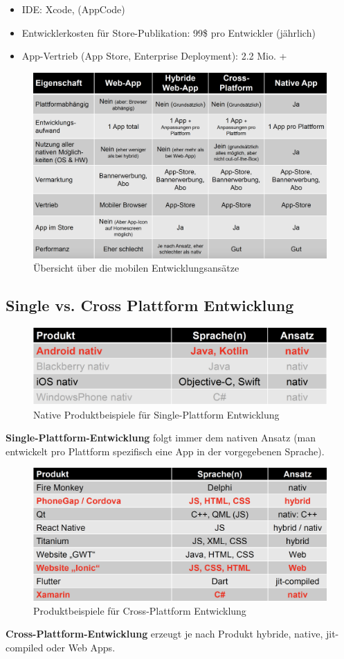 \documentclass[a4paper]{article}
\begin{document}
{\begin{itemize}
		\item IDE: Xcode, (AppCode)
		
		\item Entwicklerkosten für Store-Publikation: 99\$ pro Entwickler (jährlich)
		
		\item App-Vertrieb (App Store, Enterprise Deployment): 2.2 Mio. +
		
	\end{itemize}

	\begin{figure}[!htb]
		\centering
		\includegraphics[width=.8\textwidth]{img/android8/entwicklungsansatze_overview.png}
		\caption{Übersicht über die mobilen Entwicklungsansätze}
		\label{fig:ansatze_overview}
	\end{figure}
	
	\newpage
	
	\subsection{Single vs. Cross Plattform Entwicklung}
	
	\begin{figure}[!htb]
		\centering
		\includegraphics[width=.4\textwidth]{img/android8/single_products.png}
		\caption{Native Produktbeispiele für Single-Plattform Entwicklung}
		\label{fig:single_products}
	\end{figure}
	\noindent
	\textbf{Single-Plattform-Entwicklung} folgt immer dem nativen Ansatz (man entwickelt pro Plattform spezifisch eine App in der vorgegebenen Sprache).

	\begin{figure}[!htb]
		\centering
		\includegraphics[width=.5\textwidth]{img/android8/cross_products.png}
		\caption{Produktbeispiele für Cross-Plattform Entwicklung}
		\label{fig:cross_products}
	\end{figure}
	\noindent
	\textbf{Cross-Plattform-Entwicklung} erzeugt je nach Produkt hybride, native, jit-compiled oder Web Apps.
	
}
\end{document}
